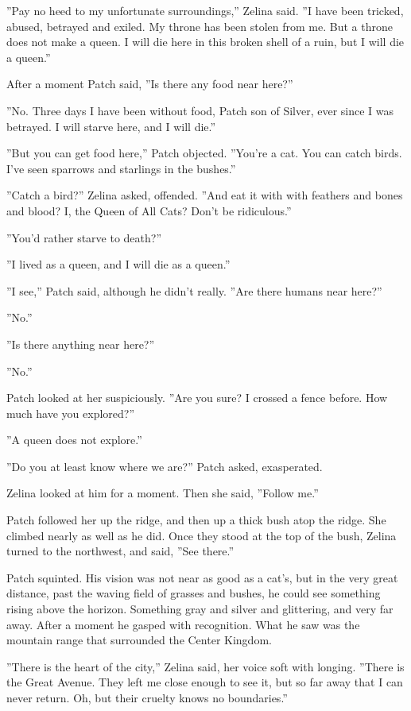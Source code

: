 \documentclass[12pt]{book}
\begin{document}
''Pay no heed to my unfortunate surroundings,'' Zelina said. ''I have been tricked, abused, betrayed and exiled. My throne has been stolen from me. But a throne does not make a queen. I will die here in this broken shell of a ruin, but I will die a queen.''\par
After a moment Patch said, ''Is there any food near here?''\par
''No. Three days I have been without food, Patch son of Silver, ever since I was betrayed. I will starve here, and I will die.''\par
 ''But you can get food here,'' Patch objected. ''You're a cat. You can catch birds. I've seen sparrows and starlings in the bushes.''\par
 ''Catch a bird?'' Zelina asked, offended. ''And eat it with %
 with feathers and bones and blood? I, the Queen of All Cats? Don't be ridiculous.''\par
 ''You'd rather starve to death?''\par
 ''I lived as a queen, and I will die as a queen.''\par
 ''I see,'' Patch said, although he didn't really. ''Are there humans near here?''\par
 ''No.''\par
 ''Is there anything near here?''\par
 ''No.''\par
 Patch looked at her suspiciously. ''Are you sure? I crossed a fence before. How much have you explored?''\par
 ''A queen does not explore.''\par
 ''Do you at least know where we are?'' Patch asked, exasperated.\par
 Zelina looked at him for a moment. Then she said, ''Follow me.''\par
 Patch followed her up the ridge, and then up a thick bush atop the ridge. She climbed nearly as well as he did. Once they stood at the top of the bush, Zelina turned to the northwest, and said, ''See there.''\par
 Patch squinted. His vision was not near as good as a cat's, but in the very great distance, past the waving field of grasses and bushes, he could see %
 something %
 rising above the horizon. Something gray and silver and glittering, and very far away. After a moment he gasped with recognition. What he saw was the mountain range that surrounded the Center Kingdom.\par
 ''There is the heart of the city,'' Zelina said, her voice soft with longing. ''There is the Great Avenue. They left me close enough to see it, but so far away that I can never return. Oh, but their cruelty knows no boundaries.''\par
\end{document}
